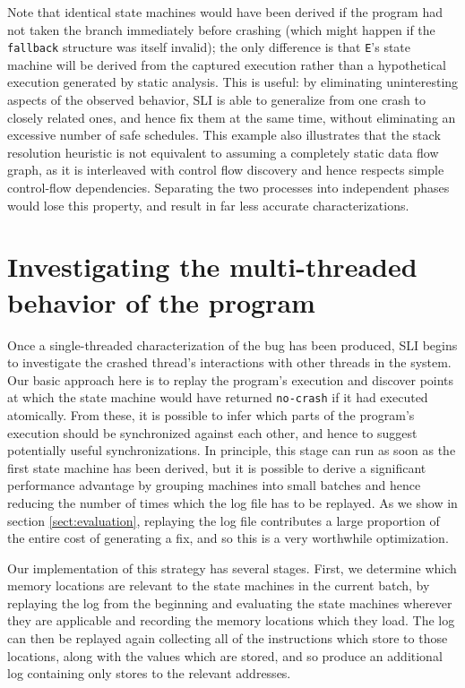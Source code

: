 \documentclass[10pt,twocolumn,preprint,natbib,authoryear]{sigplanconf}
\newcommand{\editorial}[1]{}
\begin{document}
Note that identical state machines would have been derived if the
program had not taken the branch immediately before crashing (which
might happen if the \verb|fallback| structure was itself invalid); the
only difference is that \verb|E|'s state machine will be derived from
the captured execution rather than a hypothetical execution generated
by static analysis.  This is useful: by eliminating uninteresting
aspects of the observed behavior, SLI is able to generalize from one
crash to closely related ones, and hence fix them at the same time,
without eliminating an excessive number of safe schedules.  This
example also illustrates that the stack resolution heuristic is not
equivalent to assuming a completely static data flow graph, as it is
interleaved with control flow discovery and hence respects simple
control-flow dependencies.  Separating the two processes into
independent phases would lose this property, and result in far less
accurate characterizations.\editorial{ref phase order problem?}

\section{Investigating the multi-threaded behavior of the program}
\label{sect:multi_threading}

Once a single-threaded characterization of the bug has been produced,
SLI begins to investigate the crashed thread's interactions with other
threads in the system.  Our basic approach here is to replay the
program's execution and discover points at which the state machine
would have returned \verb|no-crash| if it had executed atomically.
From these, it is possible to infer which parts of the program's
execution should be synchronized against each other, and hence to
suggest potentially useful synchronizations.  In principle, this stage
can run as soon as the first state machine has been derived, but it is
possible to derive a significant performance advantage by grouping
machines into small batches and hence reducing the number of times
which the log file has to be replayed.  As we show in section
\ref{sect:evaluation}, replaying the log file contributes a large
proportion of the entire cost of generating a fix, and so this is a
very worthwhile optimization.

Our implementation of this strategy has several stages.  First, we
determine which memory locations are relevant to the state machines in
the current batch, by replaying the log from the beginning and
evaluating the state machines wherever they are applicable and
recording the memory locations which they load.  The log can then be
replayed again collecting all of the instructions which store to those
locations, along with the values which are stored, and so produce an
additional log containing only stores to the relevant addresses.
\end{document}
